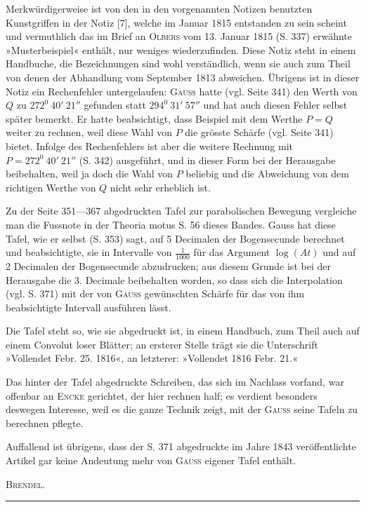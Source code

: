 \par
\noindent\hspace*{\parindent}Merkwürdigerweise ist von den in den vorgenannten Notizen benutzten Kunstgriffen in der Notiz [7], welche im Januar 1815 entstanden zu sein scheint und vermuthlich das im Brief an \textsc{Olbers} vom 13. Januar 1815 (S. 337) erwähnte »Musterbeispiel« enthält, nur weniges wiederzufinden. Diese Notiz steht in einem Handbuche, die Bezeichnungen sind wohl verständlich, wenn sie auch zum Theil von denen der Abhandlung vom September 1813 abweichen. Übrigens ist in dieser Notiz ein Rechenfehler untergelaufen: \textsc{Gauss} hatte (vgl. Seite 341) den Werth von \(Q\) zu \(272^0\ 40'\ 21''\) gefunden statt \(294^0\ 31'\ 57''\) und hat auch diesen Fehler selbst später bemerkt. Er hatte beabsichtigt, dass Beispiel mit dem Werthe \(P=Q\) weiter zu rechnen, weil diese Wahl von \(P\) die grösste Schärfe (vgl. Seite 341) bietet. Infolge des Rechenfehlers ist aber die weitere Rechnung mit \(P=272^0\ 40'\ 21''\) (S. 342) ausgeführt, und in dieser Form bei der Herausgabe beibehalten, weil ja doch die Wahl von \(P\) beliebig und die Abweichung von dem richtigen Werthe von \(Q\) nicht sehr erheblich ist.
\par
\noindent\hspace*{\parindent}Zu der Seite 351—367 abgedruckten Tafel zur parabolischen Bewegung vergleiche man die Fussnote in der Theoria motus S. 56 dieses Bandes. Gauss hat diese Tafel, wie er selbst (S. 353) sagt, auf 5 Decimalen der Bogensecunde berechnet und beabsichtigte, sie in Intervalle von \(\frac1{1000}\) für das Argument \(\log(At)\) und auf 2 Decimalen der Bogensecunde abzudrucken; aus diesem Grunde ist bei der Herausgabe die 3. Decimale beibehalten worden, so dass sich die Interpolation (vgl. S. 371) mit der von \textsc{Gauss} gewünschten Schärfe für das von ihm beabsichtigte Intervall ausführen lässt.
\par
\noindent\hspace*{\parindent}Die Tafel steht so, wie sie abgedruckt ist, in einem Handbuch, zum Theil auch auf einem Convolut loser Blätter; an ersterer Stelle trägt sie die Unterschrift »Vollendet Febr. 25. 1816«, an letzterer: »Vollendet 1816 Febr. 21.«
\par
\noindent\hspace*{\parindent}Das hinter der Tafel abgedruckte Schreiben, das sich im Nachlass vorfand, war offenbar an \textsc{Encke} gerichtet, der hier rechnen half; es verdient besonders deswegen Interesse, weil es die ganze Technik zeigt, mit der \textsc{Gauss} seine Tafeln zu berechnen pflegte.
\par
\noindent\hspace*{\parindent}Auffallend ist übrigens, dass der S. 371 abgedruckte im Jahre 1843 veröffentlichte Artikel gar keine Andeutung mehr von \textsc{Gauss} eigener Tafel enthält.
\par\smallskip
\hfill\textsc{Brendel}.
\par\endgroup\bigskip
\begin{center}\rule{.27\linewidth}{.4pt}\end{center}
